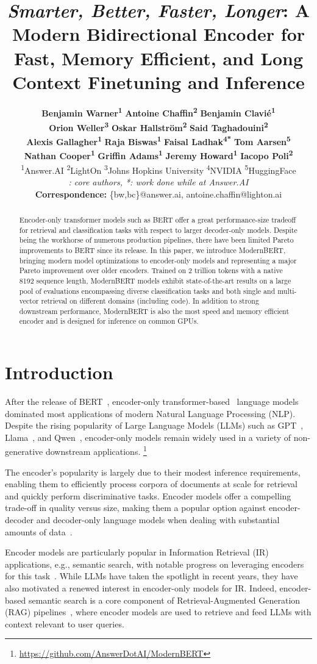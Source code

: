\documentclass[11pt]{article}
\title{\textit{Smarter, Better, Faster, Longer}: A Modern Bidirectional Encoder for Fast, Memory Efficient, and Long Context Finetuning and Inference}
\author{
 \textbf{Benjamin Warner\textsuperscript{1\textdagger}} \hspace{0.2em}
 \textbf{Antoine Chaffin\textsuperscript{2\textdagger}} \hspace{0.2em}
 \textbf{Benjamin Clavié\textsuperscript{1\textdagger}}
\\
 \textbf{Orion Weller\textsuperscript{3}} \hspace{0.2em}
 \textbf{Oskar Hallström\textsuperscript{2}} \hspace{0.2em}
 \textbf{Said Taghadouini\textsuperscript{2}}
\\
 \textbf{Alexis Gallagher\textsuperscript{1}} \hspace{0.2em}
 \textbf{Raja Biswas\textsuperscript{1}} \hspace{0.2em}
 \textbf{Faisal Ladhak\textsuperscript{4*}} \hspace{0.2em}
 \textbf{Tom Aarsen\textsuperscript{5}}
\\
 \textbf{Nathan Cooper\textsuperscript{1}} \hspace{0.2em}
 \textbf{Griffin Adams\textsuperscript{1}} \hspace{0.2em}
 \textbf{Jeremy Howard\textsuperscript{1}} \hspace{0.2em}
 \textbf{Iacopo Poli\textsuperscript{2}}
\\[1ex]
 \textsuperscript{1}Answer.AI
 \hspace{0.2em}
 \textsuperscript{2}LightOn
 \hspace{0.2em}
 \textsuperscript{3}Johns Hopkins University
 \hspace{0.2em}
 \textsuperscript{4}NVIDIA
 \hspace{0.2em}
\textsuperscript{5}HuggingFace
\\
 \small{
   \textit{\textdagger: core authors, *: work done while at Answer.AI}
   }
   \\
\small{
   \textbf{Correspondence:} \{bw,bc\}@answer.ai, antoine.chaffin@lighton.ai
 }
}
\newcommand\blfootnote[1]{%
  \begingroup
  \renewcommand\thefootnote{}\footnote{#1}%
  \addtocounter{footnote}{-1}%
  \endgroup
}
\begin{document}
\maketitle
\begin{abstract}
Encoder-only transformer models such as BERT offer a great performance-size tradeoff for retrieval and classification tasks with respect to larger decoder-only models. Despite being the workhorse of numerous production pipelines, there have been limited Pareto improvements to BERT since its release. In this paper, we introduce ModernBERT, bringing modern model optimizations to encoder-only models and representing a major Pareto improvement over older encoders. Trained on 2 trillion tokens with a native 8192 sequence length, ModernBERT models exhibit state-of-the-art results on a large pool of evaluations encompassing diverse classification tasks and both single and multi-vector retrieval on different domains (including code). In addition to strong downstream performance, ModernBERT is also the most speed and memory efficient encoder and is designed for inference on common GPUs. 
\end{abstract}

\section{Introduction}

After the release of BERT~\cite{bert}, encoder-only transformer-based~\cite{DBLP:conf/nips/VaswaniSPUJGKP17} language models dominated most applications of modern Natural Language Processing (NLP). Despite the rising popularity of Large Language Models (LLMs) such as GPT~\cite{Radford2018ImprovingLU,Radford2019,gpt3}, Llama~\cite{llama2,llama3}, and Qwen~\cite{qwen,qwen2}, encoder-only models remain widely used in a variety of non-generative downstream applications.\blfootnote{\href{https://github.com/AnswerDotAI/ModernBERT}{https://github.com/AnswerDotAI/ModernBERT}}

The encoder's popularity is largely due to their modest inference requirements, enabling them to efficiently process corpora of documents at scale for retrieval and quickly perform discriminative tasks. Encoder models offer a compelling trade-off in quality versus size, making them a popular option against encoder-decoder and decoder-only language models when dealing with substantial amounts of data~\cite{fineweb-edu}.

Encoder models are particularly popular in Information Retrieval (IR) applications, e.g., semantic search, with notable progress on leveraging encoders for this task~\cite{DBLP:conf/emnlp/KarpukhinOMLWEC20, DBLP:conf/sigir/KhattabZ20}. While LLMs have taken the spotlight in recent years, they have also motivated a renewed interest in encoder-only models for IR. Indeed, encoder-based semantic search is a core component of Retrieval-Augmented Generation (RAG) pipelines~\cite{rag}, where encoder models are used to retrieve and feed LLMs with context relevant to user queries.
\end{document}
